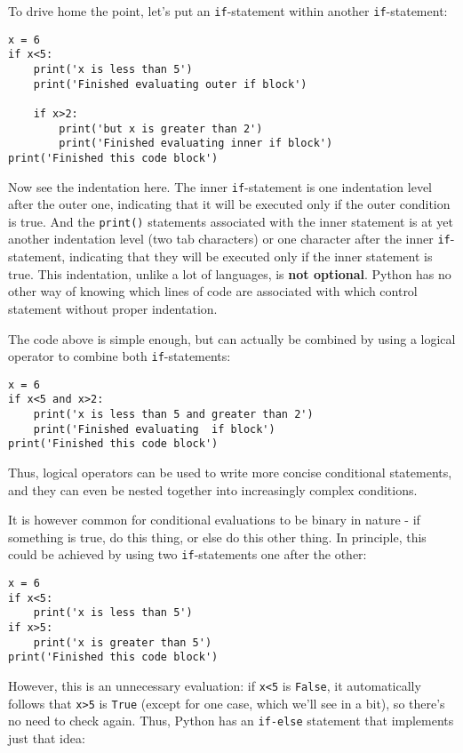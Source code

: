\documentclass[12pt]{article}
\newcommand{\code}{\texttt}
\begin{document}
To drive home the point, let's put an \code{if}-statement within another \code{if}-statement:

\begin{lstlisting}[frame=single] 
x = 6
if x<5:
    print('x is less than 5')
    print('Finished evaluating outer if block')
    
    if x>2:
        print('but x is greater than 2')
        print('Finished evaluating inner if block')
print('Finished this code block')
\end{lstlisting}

Now see the indentation here. The inner \code{if}-statement is one indentation level after the outer one, indicating that it will be executed only if the outer condition is true. And the \code{print()} statements associated with the inner statement is at yet another indentation level (two tab characters) or one character after the inner \code{if}-statement, indicating that they will be executed only if the inner statement is true. This indentation, unlike a lot of languages, is \textbf{not optional}. Python has no other way of knowing which lines of code are associated with which control statement without proper indentation. 

The code above is simple enough, but can actually be combined by using a logical operator to combine both \code{if}-statements:

\begin{lstlisting}[frame=single] 
x = 6
if x<5 and x>2:
    print('x is less than 5 and greater than 2')
    print('Finished evaluating  if block')
print('Finished this code block')
\end{lstlisting}

Thus, logical operators can be used to write more concise conditional statements, and they can even be nested together into increasingly complex conditions.

It is however common for conditional evaluations to be binary in nature - if something is true, do this thing, or else do this other thing. In principle, this could be achieved by using two \code{if}-statements one after the other:

\begin{lstlisting}[frame=single] 
x = 6
if x<5:
    print('x is less than 5')
if x>5:
    print('x is greater than 5')
print('Finished this code block')
\end{lstlisting}

However, this is an unnecessary evaluation: if \code{x<5} is \code{False}, it automatically follows that \code{x>5} is \code{True} (except for one case, which we'll see in a bit), so there's no need to check again. Thus, Python has an \code{if-else} statement that implements just that idea:
\end{document}
